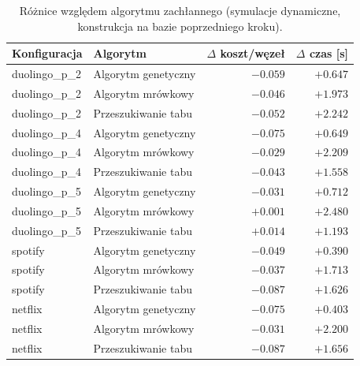 \begin{table}[H]
  \centering
  \caption{Różnice względem algorytmu zachłannego (symulacje dynamiczne, konstrukcja na bazie poprzedniego kroku).}
  \label{tab:ext-dyn-delta}
  \begin{tabular}{llrr}
    \toprule
    \textbf{Konfiguracja} & \textbf{Algorytm}   & \textbf{$\Delta$ koszt/węzeł} & \textbf{$\Delta$ czas [s]} \\
    \midrule
    duolingo\_p\_2        & Algorytm genetyczny & $-0.059$                      & $+0.647$                   \\
    duolingo\_p\_2        & Algorytm mrówkowy   & $-0.046$                      & $+1.973$                   \\
    duolingo\_p\_2        & Przeszukiwanie tabu & $-0.052$                      & $+2.242$                   \\
    duolingo\_p\_4        & Algorytm genetyczny & $-0.075$                      & $+0.649$                   \\
    duolingo\_p\_4        & Algorytm mrówkowy   & $-0.029$                      & $+2.209$                   \\
    duolingo\_p\_4        & Przeszukiwanie tabu & $-0.043$                      & $+1.558$                   \\
    duolingo\_p\_5        & Algorytm genetyczny & $-0.031$                      & $+0.712$                   \\
    duolingo\_p\_5        & Algorytm mrówkowy   & $+0.001$                      & $+2.480$                   \\
    duolingo\_p\_5        & Przeszukiwanie tabu & $+0.014$                      & $+1.193$                   \\
    spotify               & Algorytm genetyczny & $-0.049$                      & $+0.390$                   \\
    spotify               & Algorytm mrówkowy   & $-0.037$                      & $+1.713$                   \\
    spotify               & Przeszukiwanie tabu & $-0.087$                      & $+1.626$                   \\
    netflix               & Algorytm genetyczny & $-0.075$                      & $+0.403$                   \\
    netflix               & Algorytm mrówkowy   & $-0.031$                      & $+2.200$                   \\
    netflix               & Przeszukiwanie tabu & $-0.087$                      & $+1.656$                   \\

\end{tabular}
\end{table}
